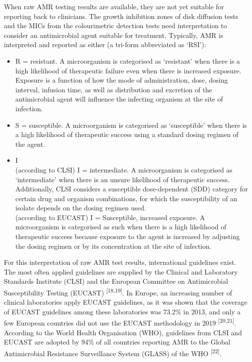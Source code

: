 \documentclass[
]{book}
\begin{document}
When raw AMR testing results are available, they are not yet suitable for reporting back to clinicians. The growth inhibition zones of disk diffusion tests and the MICs from the colourimetric detection tests need interpretation to consider an antimicrobial agent suitable for treatment. Typically, AMR is interpreted and reported as either (a tri-form abbreviated as `RSI'):

\begin{itemize}
\item
  R = resistant. A microorganism is categorised as `resistant' when there is a high likelihood of therapeutic failure even when there is increased exposure.\\
  Exposure is a function of how the mode of administration, dose, dosing interval, infusion time, as well as distribution and excretion of the antimicrobial agent will influence the infecting organism at the site of infection.
\item
  S = susceptible. A microorganism is categorised as `susceptible' when there is a high likelihood of therapeutic success using a standard dosing regimen of the agent.
\item
  I\\
  (according to CLSI) I = intermediate. A microorganism is categorised as `intermediate' when there is an unsure likelihood of therapeutic success. Additionally, CLSI considers a susceptible dose-dependent (SDD) category for certain drug and organism combinations, for which the susceptibility of an isolate depends on the dosing regimen used.\\
  (according to EUCAST) I = Susceptible, increased exposure. A microorganism is categorised as such when there is a high likelihood of therapeutic success because exposure to the agent is increased by adjusting the dosing regimen or by its concentration at the site of infection.
\end{itemize}

For this interpretation of raw AMR test results, international guidelines exist. The most often applied guidelines are supplied by the Clinical and Laboratory Standards Institute (CLSI) and the European Committee on Antimicrobial Susceptibility Testing (EUCAST) \textsuperscript{{[}18,19{]}}. In Europe, an increasing number of clinical laboratories apply EUCAST guidelines, as it was shown that the coverage of EUCAST guidelines among these laboratories was 73.2\% in 2013, and only a few European countries did not use the EUCAST methodology in 2019 \textsuperscript{{[}20,21{]}}. According to the World Health Organisation (WHO), guidelines from CLSI and EUCAST are adopted by 94\% of all countries reporting AMR to the Global Antimicrobial Resistance Surveillance System (GLASS) of the WHO \textsuperscript{{[}22{]}}.
\end{document}
